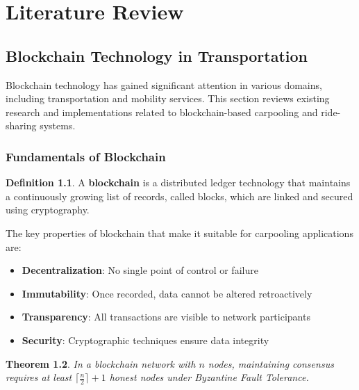 \documentclass[12pt]{report}
\theoremstyle{plain}
\newtheorem{theorem}{Theorem}[section]
\theoremstyle{definition}
\newtheorem{definition}[theorem]{Definition}
\theoremstyle{remark}
\begin{document}
\chapter{Literature Review}

\section{Blockchain Technology in Transportation}

Blockchain technology has gained significant attention in various domains, including transportation and mobility services. This section reviews existing research and implementations related to blockchain-based carpooling and ride-sharing systems.

\subsection{Fundamentals of Blockchain}

\begin{definition}
A \textbf{blockchain} is a distributed ledger technology that maintains a continuously growing list of records, called blocks, which are linked and secured using cryptography.
\end{definition}

The key properties of blockchain that make it suitable for carpooling applications are:

\begin{itemize}
    \item \textbf{Decentralization}: No single point of control or failure
    \item \textbf{Immutability}: Once recorded, data cannot be altered retroactively
    \item \textbf{Transparency}: All transactions are visible to network participants
    \item \textbf{Security}: Cryptographic techniques ensure data integrity
\end{itemize}

\begin{theorem}
In a blockchain network with $n$ nodes, maintaining consensus requires at least $\lceil \frac{n}{2} \rceil + 1$ honest nodes under Byzantine Fault Tolerance.
\end{theorem}
\end{document}
